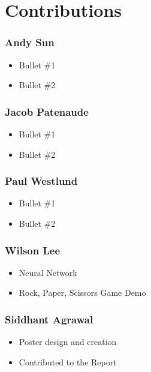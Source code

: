 \section{Contributions}

\subsubsection*{Andy Sun}
\begin{itemize}
\item Bullet \#1
\item Bullet \#2
\end{itemize}

\subsubsection*{Jacob Patenaude}
\begin{itemize}
\item Bullet \#1
\item Bullet \#2
\end{itemize}

\subsubsection*{Paul Westlund}
\begin{itemize}
\item Bullet \#1
\item Bullet \#2
\end{itemize}

\subsubsection*{Wilson Lee}
\begin{itemize}
\item Neural Network
\item Rock, Paper, Scissors Game Demo
\end{itemize}

\subsubsection*{Siddhant Agrawal}
\begin{itemize}
\item Poster design and creation
\item Contributed to the Report
\end{itemize}

